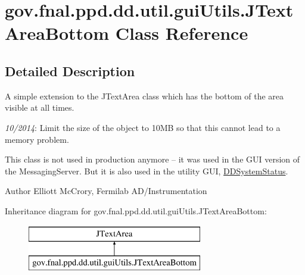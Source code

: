 \hypertarget{classgov_1_1fnal_1_1ppd_1_1dd_1_1util_1_1guiUtils_1_1JTextAreaBottom}{\section{gov.\-fnal.\-ppd.\-dd.\-util.\-gui\-Utils.\-J\-Text\-Area\-Bottom Class Reference}
\label{classgov_1_1fnal_1_1ppd_1_1dd_1_1util_1_1guiUtils_1_1JTextAreaBottom}
}


\subsection{Detailed Description}
A simple extension to the J\-Text\-Area class which has the bottom of the area visible at all times. 

{\itshape 10/2014}\-: Limit the size of the object to 10\-M\-B so that this cannot lead to a memory problem. 

This class is not used in production anymore -- it was used in the G\-U\-I version of the Messaging\-Server. But it is also used in the utility G\-U\-I, \hyperlink{classgov_1_1fnal_1_1ppd_1_1dd_1_1DDSystemStatus}{D\-D\-System\-Status}. 

\begin{DoxyAuthor}{Author}
Elliott Mc\-Crory, Fermilab A\-D/\-Instrumentation 
\end{DoxyAuthor}
Inheritance diagram for gov.\-fnal.\-ppd.\-dd.\-util.\-gui\-Utils.\-J\-Text\-Area\-Bottom\-:\begin{figure}[H]
\begin{center}
\leavevmode
\includegraphics[height=2.000000cm]{classgov_1_1fnal_1_1ppd_1_1dd_1_1util_1_1guiUtils_1_1JTextAreaBottom}
\end{center}
\end{figure}

